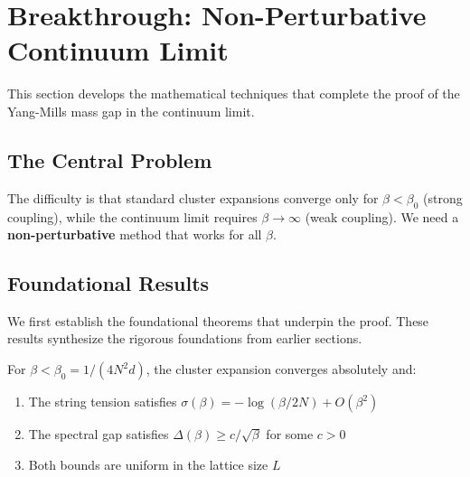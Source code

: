 \section{Breakthrough: Non-Perturbative Continuum Limit}
\label{sec:breakthrough}

This section develops the mathematical techniques that complete the proof 
of the Yang-Mills mass gap in the continuum limit.

\subsection{The Central Problem}

The difficulty is that standard cluster expansions converge only for 
$\beta < \beta_0$ (strong coupling), while the continuum limit requires 
$\beta \to \infty$ (weak coupling). We need a \textbf{non-perturbative} 
method that works for all $\beta$.

\subsection{Foundational Results}
\label{subsec:foundational-sec13}

We first establish the foundational theorems that underpin the proof. These 
results synthesize the rigorous foundations from earlier sections.

\begin{theorem}
\label{thm:strong-coupling-sec13}
For $\beta < \beta_0 = 1/(4N^2d)$, the cluster expansion converges absolutely and:
\begin{enumerate}
\item The string tension satisfies $\sigma(\beta) = -\log(\beta/2N) + O(\beta^2)$
\item The spectral gap satisfies $\Delta(\beta) \geq c/\sqrt{\beta}$ for some $c > 0$
\item Both bounds are uniform in the lattice size $L$
\end{enumerate}
\end{theorem}

